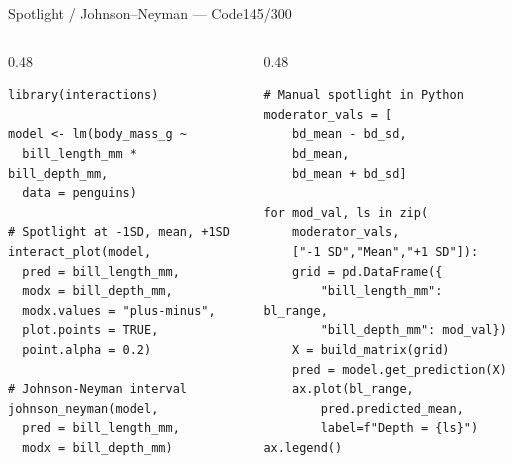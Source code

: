 \documentclass[10pt]{beamer}
\newcommand{\smark}[1]{\hfill{\scriptsize\color{codegray}#1}}
\begin{document}
\begin{frame}[fragile]{Spotlight / Johnson--Neyman --- Code}\smark{145/300}
\begin{columns}[T]
\begin{column}{0.48\textwidth}
\begin{lstlisting}[style=Rstyle]
library(interactions)

model <- lm(body_mass_g ~
  bill_length_mm * bill_depth_mm,
  data = penguins)

# Spotlight at -1SD, mean, +1SD
interact_plot(model,
  pred = bill_length_mm,
  modx = bill_depth_mm,
  modx.values = "plus-minus",
  plot.points = TRUE,
  point.alpha = 0.2)

# Johnson-Neyman interval
johnson_neyman(model,
  pred = bill_length_mm,
  modx = bill_depth_mm)
\end{lstlisting}
\end{column}
\begin{column}{0.48\textwidth}
\begin{lstlisting}[style=Pystyle]
# Manual spotlight in Python
moderator_vals = [
    bd_mean - bd_sd,
    bd_mean,
    bd_mean + bd_sd]

for mod_val, ls in zip(
    moderator_vals,
    ["-1 SD","Mean","+1 SD"]):
    grid = pd.DataFrame({
        "bill_length_mm": bl_range,
        "bill_depth_mm": mod_val})
    X = build_matrix(grid)
    pred = model.get_prediction(X)
    ax.plot(bl_range,
        pred.predicted_mean,
        label=f"Depth = {ls}")
ax.legend()
\end{lstlisting}
\end{column}
\end{columns}
\end{frame}
\end{document}
